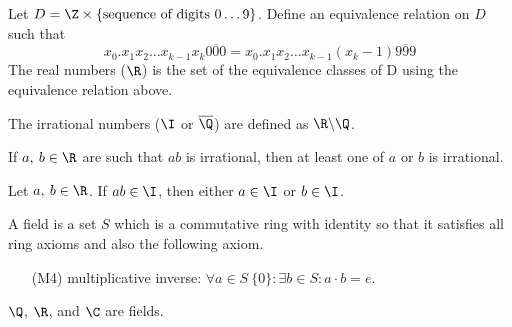 \documentclass{article}
\begin{document}
%
\begin{definition}
    Let $D = \Z \times \{\text{sequence of digits $0\ldots 9$}\}$.
    Define an equivalence relation on $D$ such that
    \begin{equation*}
        x_0 . x_1 x_2 \dots x_{k-1} x_k \overline{000} = x_0 . x_1 x_2 \dots x_{k-1} \left(x_k - 1\right)\overline{999}
    \end{equation*}
    The real numbers ($\R$) is the set of the equivalence classes of D using the equivalence relation above.
\end{definition}
%
\begin{definition}
    The irrational numbers ($\I$ or $\overline{\Q}$) are defined as $\R\backslash\Q$.
\end{definition}
\begin{theorem}
    If $a,\:b\in\R$ are such that $ab$ is irrational, then at least one of $a$ or $b$ is irrational.
\end{theorem}
%
\begin{note}
    Let $a,\: b\in \R$. If $ab\in\I$, then either $a\in\I$ or $b\in\I$.
\end{note}
%
\begin{tcolorboxlarge}[title={Field Axioms}]
    \begin{definition}[Field]
        A field is a set $S$ which is a commutative ring with identity so that it satisfies all ring axioms and also the following axiom.
    \end{definition}
    \begin{enumerate}
        \item[(M4)] multiplicative inverse: $\forall a \in S \ \{0\}:\exists b \in S: a\cdot b=e$.
    \end{enumerate}
\end{tcolorboxlarge}
\begin{note}
    $\Q$, $\R$, and $\C$ are fields.
\end{note}
%
\end{document}
